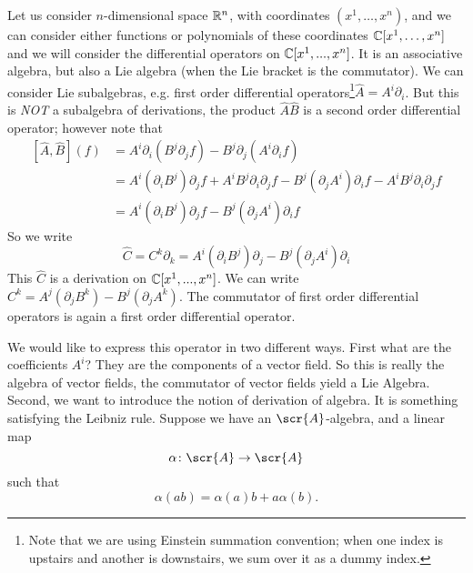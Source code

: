 
Let us consider $n$-dimensional space $\Bbb{R}^{n}$, with
coordinates $(x^1,\ldots,x^n)$, and we can consider either
functions or polynomials of these coordinates
$\Bbb{C}[x^1,\ldots,x^n]$ and we will consider the differential
operators on $\Bbb{C}[x^1,...,x^n]$. It is an associative
algebra, but also a Lie algebra (when the Lie bracket is the
commutator). We can consider Lie subalgebras, e.g. first order
differential operators\footnote{Note that we are using Einstein
  summation convention; when one index is upstairs and another is
  downstairs, we sum over it as a dummy index.}$\widehat{A}=A^{i}\partial_{i}$. But this
is \emph{NOT} a subalgebra of derivations, the product
$\widehat{A}\widehat{B}$ is a second order differential operator;
however note that
\begin{subequations}
\begin{align}
[\widehat{A},\widehat{B}](f)&=A^{i}\partial_{i}(B^{j}\partial_{j}f)-B^{j}\partial_{j}(A^{i}\partial_{i}f)\\
&=A^{i}(\partial_{i}B^{j})\partial_{j}f+A^{i}B^{j}\partial_{i}\partial_{j}f-B^{j}(\partial_{j}A^{i})\partial_{i}f-A^{i}B^{j}\partial_{i}\partial_{j}f\\
&=A^{i}(\partial_{i}B^{j})\partial_{j}f-B^{j}(\partial_{j}A^{i})\partial_{i}f
\end{align}
\end{subequations}
So we write
\begin{equation}
\widehat{C}=C^{k}\partial_{k}=A^{i}(\partial_{i}B^{j})\partial_{j}-B^{j}(\partial_{j}A^{i})\partial_{i}
\end{equation}
This $\widehat{C}$ is a derivation on $\Bbb{C}[x^1,...,x^n]$. We
can write
$C^k=A^{j}(\partial_{j}B^{k})-B^{j}(\partial_{j}A^{k})$. The
commutator of first order differential operators is again a first
order differential operator.

We would like to express this operator in two different
ways. First what are the coefficients $A^i$? They are the
components of a vector field. So this is really the algebra of
vector fields, the commutator of vector fields yield a Lie
Algebra. Second, we want to introduce the notion of derivation of
algebra. It is something satisfying the Leibniz rule. Suppose we
have an $\scr{A}$-algebra, and a linear map
\begin{equation}
\alpha\colon\scr{A}\to\scr{A}
\end{equation}
such that
\begin{equation}
\alpha(ab)=\alpha(a)b+a\alpha(b).
\end{equation}

